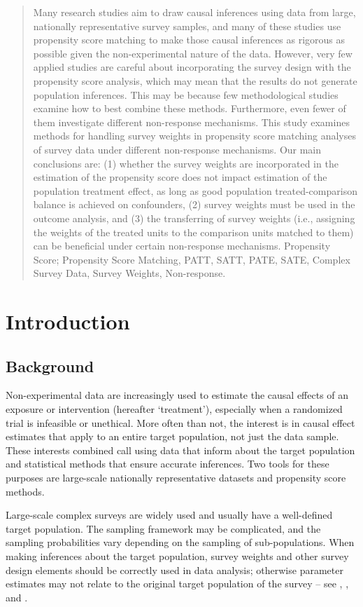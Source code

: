 \documentclass[oupdraft]{bio}
\begin{document}
\begin{abstract}
{Many research studies aim to draw causal inferences using data from large, nationally representative survey samples, and many of these studies use propensity score matching to make those causal inferences as rigorous as possible given the non-experimental nature of the data. However, very few applied studies are careful about incorporating the survey design with the propensity score analysis, which may mean that the results do not  generate population inferences. This may be because few methodological studies examine how to best combine these methods. Furthermore, even fewer of them investigate different non-response mechanisms. This study examines methods for handling survey weights in propensity score matching analyses of survey data under different non-response mechanisms. Our main conclusions are: (1) whether the survey weights are incorporated in the estimation of the propensity score does not impact estimation of the population treatment effect, as long as good population treated-comparison balance is achieved on confounders, (2) survey weights must be used in the outcome analysis, and (3) the transferring of survey weights (i.e., assigning the weights of the treated units to the comparison units matched to them) can be beneficial under certain non-response mechanisms.}
{Propensity Score; Propensity Score Matching, PATT, SATT, PATE, SATE, Complex Survey Data, Survey Weights, Non-response.}
\end{abstract}


\section{Introduction}
\label{S1}
\subsection{Background}
\label{S1.1}
Non-experimental data are increasingly used to estimate the causal effects of an exposure or intervention (hereafter `treatment'), especially when a randomized trial is infeasible or unethical. More often than not, the interest is in causal effect estimates that apply to an entire target population, not just the data sample. These interests combined call using data that inform about the target population and statistical methods that ensure accurate inferences. Two tools for these purposes are large-scale nationally representative datasets and propensity score methods.

Large-scale complex surveys are widely used and usually have a well-defined target population. The sampling framework may be complicated, and the sampling probabilities vary depending on the sampling of sub-populations. When making inferences about the target population, survey weights and other survey design elements should be correctly used in data analysis; otherwise parameter estimates may not relate to the original target population of the survey
-- see \citet{hansen1983evaluation}, \citet{korn1995analysis}, \citet{korn1995examples} and \citet{little2003bayesian}.
\end{document}
